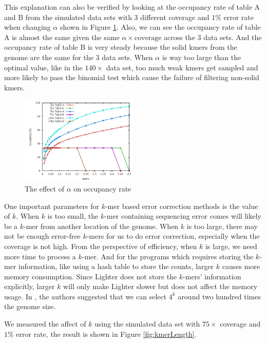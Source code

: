 \documentclass[10pt]{article}
\begin{document}
This explanation can also be verified by looking at the occupancy rate of table A and B from the simulated data sets with 3 different coverage and $1\%$ error rate when changing $\alpha$ shown in Figure \ref{fig:bloom_occupancy_alpha_all}. Also, we can see the occupancy rate of table A is almost the same given the same $\alpha\times\mbox{coverage}$ across the 3 data sets. And the occupancy rate of table B is very steady because the solid kmers from the genome are the same for the 3 data sets. When $\alpha$ is way too large than the optimal value, like in the $140\times$ data set, too much weak kmers get sampled and more likely to pass the binomial test which cause the failure of filtering non-solid kmers.

\begin{figure}[h!]
\begin{center}
\includegraphics[width=0.5\textwidth]{bloom_occupancy_alpha_all.jpg}
\caption{The effect of $\alpha$ on occupancy rate\label{fig:bloom_occupancy_alpha_all}}
\end{center}
\end{figure}

One important parameters for $k$-mer based error correction methods is the value of $k$. When $k$ is too small, the $k$-mer containing sequencing error comes will likely be a $k$-mer from another location of the genome. When $k$ is too large, there may not be enough error-free $k$-mers for us to do error correction, especially when the coverage is not high. From the perspective of efficiency, when $k$ is large, we need more time to process a $k$-mer. And for the programs which requires storing the $k$-mer information, like using a hash table to store the counts, larger $k$ causes more memory consumption. Since Lighter does not store the $k$-mers' information explicitly, larger $k$ will only make Lighter slower but does not affect the memory usage.  In \cite{kelley2010quake}, the authors suggested that we can select $4^k$ around two hundred times the genome size. 

We measured the affect of $k$ using the simulated data set with $75\times$ coverage and $1\%$ error rate, the result is shown in Figure \ref{fig:kmerLength}. 
\end{document}
